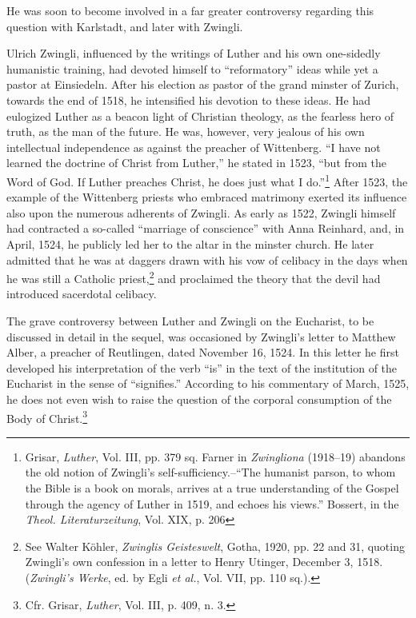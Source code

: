 He was soon to become involved in a far greater controversy regarding
this question with Karlstadt, and later with Zwingli.

Ulrich Zwingli, influenced by the writings of Luther and his own
one-sidedly humanistic training, had devoted himself to “reformatory”
ideas while yet a pastor at Einsiedeln. After his election as pastor of
the grand minster of Zurich, towards the end of 1518, he
intensified his devotion to these ideas. He had eulogized Luther as a
beacon light of Christian theology, as the fearless hero of truth, as
the man of the future. He was, however, very jealous of his own intellectual
independence as against the preacher of Wittenberg. “I
have not learned the doctrine of Christ from Luther,” he stated in
1523, “but from the Word of God. If Luther preaches Christ, he
does just what I do.”\footnote
{Grisar, \textit{Luther}, Vol. III, pp. 379 sq. Farner in \textit{Zwingliona} (1918--19) abandons the
old notion of Zwingli’s self-sufficiency.--“The humanist parson, to whom the Bible is a
book on morals, arrives at a true understanding of the Gospel through the agency of
Luther in 1519, and echoes his views.” Bossert, in the \textit{Theol. Literaturzeitung}, Vol. XIX,
p. 206}
After 1523, the example of the Wittenberg
priests who embraced matrimony exerted its influence also upon the
numerous adherents of Zwingli. As early as 1522, Zwingli himself
had contracted a so-called “marriage of conscience” with Anna
Reinhard, and, in April, 1524, he publicly led her to the altar in the
minster church. He later admitted that he was at daggers drawn with
his vow of celibacy in the days when he was still a Catholic priest,\footnote
{See Walter Köhler, \textit{Zwinglis Geisteswelt}, Gotha, 1920, pp. 22 and 31, quoting Zwingli’s
own confession in a letter to Henry Utinger, December 3, 1518. (\textit{Zwingli’s Werke}, ed. by
Egli \textit{et al.}, Vol. VII, pp. 110 sq.).}
and proclaimed the theory that the devil had introduced sacerdotal
celibacy.

The grave controversy between Luther and Zwingli on the Eucharist, to
be discussed in detail in the sequel, was occasioned by
Zwingli’s letter to Matthew Alber, a preacher of Reutlingen, dated
November 16, 1524. In this letter he first developed his interpretation
of the verb “is” in the text of the institution of the Eucharist in the
sense of “signifies.” According to his commentary of March, 1525,
he does not even wish to raise the question of the corporal consumption
of the Body of Christ.\footnote{Cfr. Grisar, \textit{Luther}, Vol. III, p. 409, n. 3.}

